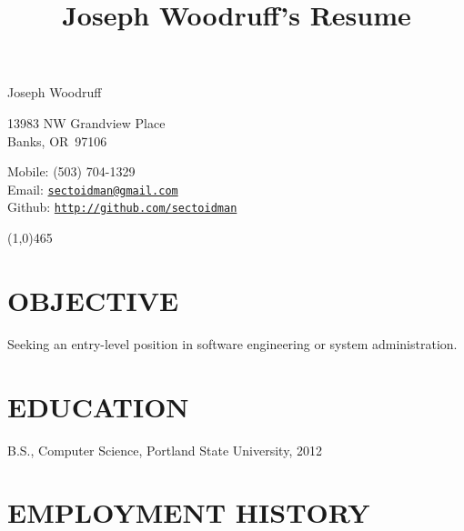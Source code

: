 \documentclass{article}
\title{Joseph Woodruff's Resume}
\makeatletter
\newcommand{\name}{Joseph Woodruff}
\newcommand{\address}{13983 NW Grandview Place}
\newcommand{\city}{Banks}
\newcommand{\state}{OR}
\newcommand{\zip}{97106}
\newcommand{\phone}{(503) 704-1329}
\newcommand{\email}{\href{mailto:sectoidman@gmail.com}{sectoidman@gmail.com}}
\newcommand{\webpage}{http://github.com/sectoidman}
\makeatother
\begin{document}
{\huge \name}

\vspace{0.125in}

\begin{minipage}[t]{0.5\textwidth}
	\address\\
	\city, \state\ \zip
\end{minipage}
\begin{minipage}[t]{0.5\textwidth}
	Mobile: \phone \\
	Email: \texttt{\email} \\Github: \texttt{\url{\webpage}} \\
\end{minipage}

\begin{center}
\line(1,0){465}
\end{center}

\section*{OBJECTIVE}
	Seeking an entry-level position in software engineering or system administration.

\section*{EDUCATION}
	B.S., Computer Science, Portland State University, 2012


\renewenvironment{itemize}{
	\begin{list}{$\bullet$}{
	\setlength{\leftmargin}{1.5em}
	\setlength{\itemsep}{0.25em}
	\setlength{\parskip}{0pt}
	\setlength{\parsep}{0.25em}
}
}{
	\end{list}
}

\section*{EMPLOYMENT HISTORY}
\end{document}
